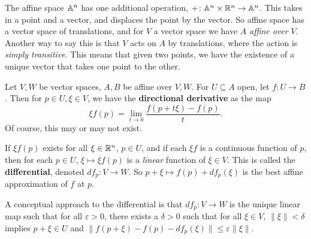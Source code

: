 The affine space $\mathbb{A}^n $ has one additional operation, $+ \colon \mathbb{A}^n  \times \mathbb{R}^n  \to \mathbb{A}^n $. This takes in a point and a vector, and displaces the point by the vector. So affine space has a vector space of translations, and for $V$ a vector space we have $A$ \emph{affine over} $V$. Another way to say this is that $V$ acts on $A$ by translations, where the action is \emph{simply transitive}. This means that given two points, we have the existence of a unique vector that takes one point to the other.

\orbreak
Let $V,W$ be vector spaces, $A,B$ be affine over $V,W$. For $U \subseteq A$ open, let $f \colon U \to B$. Then for $p \in U, \xi \in V$, we have the \textbf{directional derivative} as the map\[
    \xi f(p)= \lim _{t \to  0}\frac{f(p+t \xi)-f(p)}{t}.
\] Of course, this may or may not exist.
\begin{theorem}
    If $\xi f(p)$ exists for all $\xi \in \mathbb{R}^n $, $p \in  U$, and if each $\xi f$ is a continuous function of $p$, then for each $p \in U$, $\xi \mapsto  \xi f(p)$ is a \emph{linear} function of $\xi \in V$. This is called the \textbf{differential}, denoted $    df_p \colon V \to W.$ So $p+\xi \mapsto f(p)+d f_p(\xi)$ is the best affine approximation of $f$ at $p$.
\end{theorem}
A conceptual approach to the differential is that $df_p \colon V \to W$ is the unique linear map such that for all $\varepsilon >0$, there exists a $\delta >0$ such that for all $\xi \in V$, $\| \xi\|<\delta$ implies $p+\xi \in U$ and $\|f(p+\xi)-f(p)-df_p(\xi)\| \leq \varepsilon \|\xi\|$.
